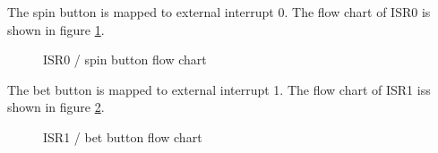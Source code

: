 \documentclass[a4paper,13pt,openany,sffamily]{memoir}
\begin{document}
\clearpage
The spin button is mapped to external interrupt 0. The flow chart of ISR0 is shown in figure \ref{Fig_ISR0_Loop}.
\begin{figure}[h]
\caption{ISR0 / spin button flow chart }
\label{Fig_ISR0_Loop}
\end{figure}


\clearpage
The bet button is mapped to external interrupt 1. The flow chart of ISR1 iss shown in figure \ref{Fig_ISR1_Loop}.
\begin{figure}[h]
\caption{ISR1 / bet button flow chart }
\label{Fig_ISR1_Loop}
\end{figure}
\end{document}
